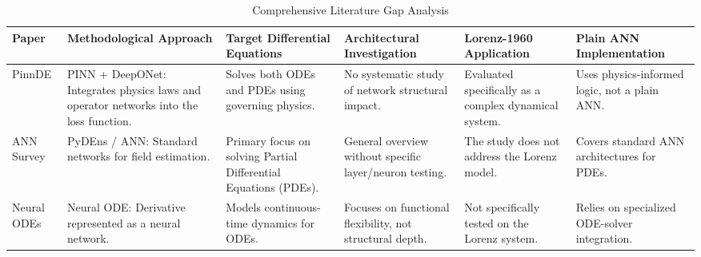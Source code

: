 \vspace{-1em} %

\begin{table}[!ht] %
    \centering
    \caption{Comprehensive Literature Gap Analysis}
    \label{tab:gap_analysis_updated}
    \tiny %
    \renewcommand{\arraystretch}{1.0} 
    \setlength{\tabcolsep}{2pt} %
    
    \begin{tabularx}{\textwidth}{| 
        >{\hsize=0.6\hsize\raggedright\arraybackslash}X | 
        >{\hsize=1.15\hsize\raggedright\arraybackslash}X | 
        >{\hsize=1.15\hsize\raggedright\arraybackslash}X | 
        >{\hsize=1.05\hsize\raggedright\arraybackslash}X | 
        >{\hsize=1.05\hsize\raggedright\arraybackslash}X | 
        >{\hsize=1.0\hsize\raggedright\arraybackslash}X |
        }
        \hline
        \textbf{Paper} & \textbf{Methodological Approach} & \textbf{Target Differential Equations} & \textbf{Architectural Investigation} & \textbf{Lorenz-1960 Application} & \textbf{Plain ANN Implementation} \\
        \hline
        
        PinnDE \cite{matthews2024pinnde} & PINN + DeepONet: Integrates physics laws and operator networks into the loss function. & Solves both ODEs and PDEs using governing physics. & No systematic study of network structural impact. & Evaluated specifically as a complex dynamical system. & Uses physics-informed logic, not a plain ANN. \\
        \hline
        
        ANN Survey \cite{pratama2022ann} & PyDEns / ANN: Standard networks for field estimation. & Primary focus on solving Partial Differential Equations (PDEs). & General overview without specific layer/neuron testing. & The study does not address the Lorenz model. & Covers standard ANN architectures for PDEs. \\
        \hline
        
        Neural ODEs \cite{chen2018neural} & Neural ODE: Derivative represented as a neural network. & Models continuous-time dynamics for ODEs. & Focuses on functional flexibility, not structural depth. & Not specifically tested on the Lorenz system. & Relies on specialized ODE-solver integration. \\
        \hline
        

\end{tabularx}
\end{table}
